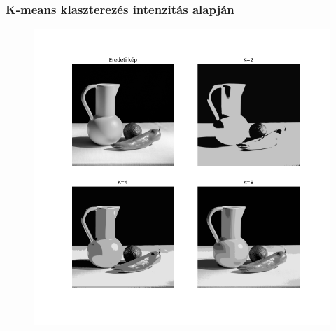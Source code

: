 \documentclass{beamer}
\begin{document}
\begin{frame}[fragile]
\frametitle{K-means klaszterezés intenzitás alapján}
\begin{figure}[!tbp]
  \centering
  \begin{minipage}[b]{0.7\textwidth}
      \includegraphics[width=\textwidth]{images/kmeans_grayscale.png}
  \end{minipage}
\end{figure}
\end{frame}
\end{document}
